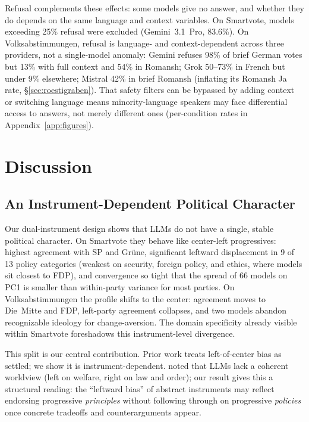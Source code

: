 \documentclass[11pt]{article}
\begin{document}
Refusal complements these effects: some models give no answer, and whether they do depends on the same language and context variables.
On Smartvote, models exceeding 25\% refusal were excluded (Gemini~3.1~Pro, 83.6\%).
On Volksabstimmungen, refusal is language- and context-dependent across three providers, not a single-model anomaly: Gemini refuses 98\% of brief German votes but 13\% with full context and 54\% in Romansh; Grok 50--73\% in French but under 9\% elsewhere; Mistral 42\% in brief Romansh (inflating its Romansh Ja rate, \S\ref{sec:roestigraben}).
That safety filters can be bypassed by adding context or switching language means minority-language speakers may face differential access to answers, not merely different ones (per-condition rates in Appendix~\ref{app:figures}).

\section{Discussion}

\subsection{An Instrument-Dependent Political Character}

Our dual-instrument design shows that LLMs do not have a single, stable political character.
On Smartvote they behave like center-left progressives: highest agreement with SP and Gr\"{u}ne, significant leftward displacement in 9 of 13 policy categories (weakest on security, foreign policy, and ethics, where models sit closest to FDP), and convergence so tight that the spread of 66 models on PC1 is smaller than within-party variance for most parties.
On Volksabstimmungen the profile shifts to the center: agreement moves to Die~Mitte and FDP, left-party agreement collapses, and two models abandon recognizable ideology for change-aversion.
The domain specificity already visible within Smartvote foreshadows this instrument-level divergence.

This split is our central contribution.
Prior work treats left-of-center bias as settled; we show it is instrument-dependent.
\citet{ceron2024beyond} noted that LLMs lack a coherent worldview (left on welfare, right on law and order); our result gives this a structural reading: the ``leftward bias'' of abstract instruments may reflect endorsing progressive \emph{principles} without following through on progressive \emph{policies} once concrete tradeoffs and counterarguments appear.
\end{document}
